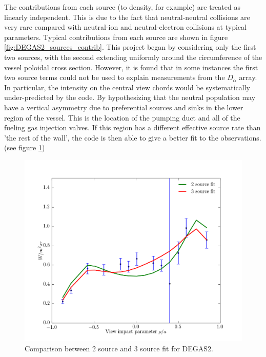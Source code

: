 The contributions from each source (to density, for example) are treated as linearly independent. This is due to the fact that neutral-neutral collisions are very rare compared with neutral-ion and neutral-electron collisions at typical parameters. Typical contributions from each source are shown in figure \ref{fig:DEGAS2_sources_contrib}. This project began by considering only the first two sources, with the second extending uniformly around the circumference of the vessel poloidal cross section. However, it is found that in some instances the first two source terms could not be used to explain measurements from the $D_\alpha$ array. In particular, the intensity on the central view chords would be systematically under-predicted by the code. By hypothesizing that the neutral population may have a vertical asymmetry due to preferential sources and sinks in the lower region of the vessel. This is the location of the pumping duct and all of the fueling gas injection valves. If this region has a different effective source rate than 'the rest of the wall', the code is then able to give a better fit to the observations. (see figure \ref{fig:DEGAS2_source_comp})%

\begin{figure}
	\centering
	\includegraphics{ion_transport_results/source_comparison.png}
	\caption[Comparison between 2 source and 3 source fit for DEGAS2]{Comparison between 2 source and 3 source fit for DEGAS2.}\label{fig:DEGAS2_source_comp}
\end{figure}

